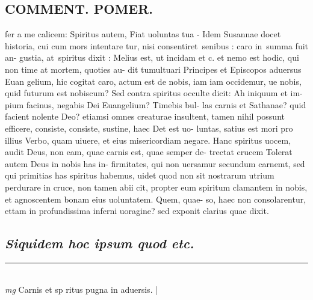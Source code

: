 \documentclass{article}
\begin{document}
\begin{pages}
\section*{COMMENT. POMER.  }\pstart fer a me calicem: Spiritus autem, Fiat uoluntas tua - Idem Susannae docet historia, cui cum mors intentare tur, nisi consentiret senibus : caro in summa fuit an- gustia, at spiritus dixit : Melius est, ut incidam et c.  et nemo est hodic, qui non time at mortem, quoties au- dit tumultuari Principes et Episcopos aduersus Euan gelium, hic cogitat caro, actum est de nobis, iam iam occidemur, ue nobis, quid futurum est nobiscum? Sed contra spiritus occulte dicit: Ah iniquum et im- pium facinus, negabis Dei Euangelium? Timebis bul- las carnis et Sathanae? quid facient nolente Deo? etiamsi omnes creaturae insultent, tamen nihil possunt efficere, consiste, consiste, sustine, haec Det est uo- luntas, satius est mori pro illius Verbo, quam uiuere, et eius misericordiam negare. Hanc spiritus uocem, audit Deus, non eam, quae carnis est, quae semper de- trectat crucem Tolerat autem Deus in nobis has in- firmitates, qui non uersamur secundum carnemt, sed qui primitias has spiritus habemus, uidet quod non sit nostrarum utrium perdurare in cruce, non tamen abii cit, propter eum spiritum clamantem in nobis, et agnoscentem bonam eius uoluntatem. Quem, quae- so, haec non consolarentur, ettam in profundissima inferni uoragine? sed exponit clarius quae dixit.   \pend
{}
{}
\subsection*{\textit{Siquidem hoc ipsum quod etc. }}
\vspace{0.5cm}\noindent
\vspace{0.2cm}\rule{1cm}{0.2pt}\\ 
\hspace{0.2cm}\textit{mg}
\footnotesize Carnis et sp ritus pugna in aduersis. 
\normalsize| 

\end{pages}
\end{document}
